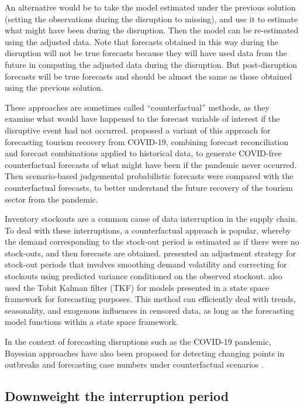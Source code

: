 \documentclass[
  11pt,
  a4paper,
]{article}
\begin{document}
An alternative would be to take the model estimated under the previous
solution (setting the observations during the disruption to missing),
and use it to estimate what might have been during the disruption. Then
the model can be re-estimated using the adjusted data. Note that
forecasts obtained in this way during the disruption will not be true
forecasts because they will have used data from the future in computing
the adjusted data during the disruption. But post-disruption forecasts
will be true forecasts and should be almost the same as those obtained
using the previous solution.

These approaches are sometimes called ``counterfactual'' methods, as
they examine what would have happened to the forecast variable of
interest if the disruptive event had not occurred.
\textcite{athanasopoulos2023probabilistic} proposed a variant of this
approach for forecasting tourism recovery from COVID-19, combining
forecast reconciliation and forecast combinations applied to historical
data, to generate COVID-free counterfactual forecasts of what might have
been if the pandemic never occurred. Then scenario-based judgemental
probabilistic forecasts were compared with the counterfactual forecasts,
to better understand the future recovery of the tourism sector from the
pandemic.

Inventory stockouts are a common cause of data interruption in the
supply chain. To deal with these interruptions, a counterfactual
approach is popular, whereby the demand corresponding to the stock-out
period is estimated as if there were no stock-outs, and then forecasts
are obtained. \textcite{Bell2000} presented an adjustment strategy for
stock-out periods that involves smoothing demand volatility and
correcting for stockouts using predicted variance conditioned on the
observed stockout. \textcite{trapero2023demand} also used the Tobit
Kalman filter (TKF) for models presented in a state space framework for
forecasting purposes. This method can efficiently deal with trends,
seasonality, and exogenous influences in censored data, as long as the
forecasting model functions within a state space framework.

In the context of forecasting disruptions such as the COVID-19 pandemic,
Bayesian approaches have also been proposed for detecting changing
points in outbreaks and forecasting case numbers under counterfactual
scenarios \autocite{dehning2020inferring}.

\subsection{Downweight the interruption
period}\label{downweight-the-interruption-period}
\end{document}
